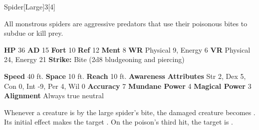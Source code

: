   \begin{monsection}{Spider}[Large]{3}[4]
    \vspace{-1em}\vspace{-1em}
    \vspace{0em}

    
    All monstrous spiders are aggressive predators that use their poisonous bites to subdue or kill prey.
  
    

    \begin{spellcontent}
      \begin{spelltargetinginfo}
        \pari \textbf{HP} 36 \monsep
          \textbf{AD} 15 \monsep
          \textbf{Fort} 10 \monsep
          \textbf{Ref} 12 \monsep
          \textbf{Ment} 8
        \pari \textbf{WR} Physical 9, Energy 6 \monsep
        \textbf{VR} Physical 24, Energy 21
        \pari \textbf{Strike:}
            Bite  (2d8 bludgeoning and piercing)
      \end{spelltargetinginfo}
    \end{spellcontent}
    \begin{monsterfooter}
      \pari \textbf{Speed} 40 ft. \monsep
        \textbf{Space} 10 ft. \monsep
        \textbf{Reach} 10 ft.
      \pari \textbf{Awareness} 
      \pari \textbf{Attributes}
        Str 2, Dex 5,
        Con 0, Int -9,
        Per 4, Wil 0
      \pari \textbf{Accuracy} 7 \monsep
        \textbf{Mundane Power} 4 \monsep
      \textbf{Magical Power} 3
      \pari \textbf{Alignment} Always true neutral
    \end{monsterfooter}
  \end{monsection}
    Whenever a creature is  by the large spider's bite,
      the damaged creature becomes .
    Its initial effect makes the target .
    On the poison's third hit, the target is .
  

